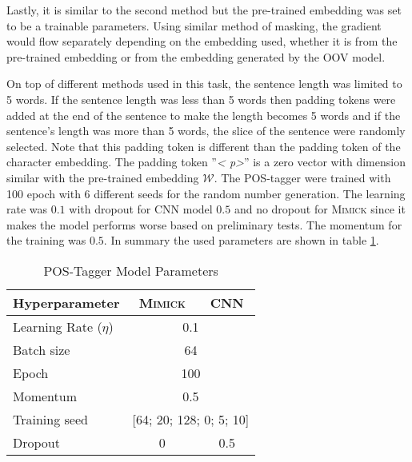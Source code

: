        Lastly, it is similar to the second method but the pre-trained
        embedding was set to be a trainable parameters. Using similar
        method of masking, the gradient would flow separately depending
        on the embedding used, whether it is from the pre-trained
        embedding or from the embedding generated by the OOV model.

        On top of different methods used in this task, the sentence
        length was limited to 5 words. If the sentence length was less
        than 5 words then padding tokens were added at the end of the
        sentence to make the length becomes 5 words and if the
        sentence's length was more than 5 words, the slice of the
        sentence were randomly selected. Note that this padding token
        is different than the padding token of the character
        embedding. The padding token ''\textit{\textless
        p\textgreater}'' is a zero vector with dimension similar with
        the pre-trained embedding $\mathcal{W}$. The POS-tagger were
        trained with 100 epoch with 6 different seeds for the random
        number generation. The learning rate was $0.1$ with dropout
        for CNN model $0.5$ and no dropout for \textsc{Mimick} since
        it makes the model performs worse based on preliminary tests.
        The momentum for the training was $0.5$. In summary the used
        parameters are shown in table \ref{tab:hyperparameterpostag}.

        \begin{table}[]
            \centering
            \caption{POS-Tagger Model Parameters}
            \label{tab:hyperparameterpostag}
            \begin{tabular}{@{}lcc@{}}
                \toprule
                \textbf{Hyperparameter} & \multicolumn{1}{c}{\textbf{\textsc{Mimick}}} & \multicolumn{1}{c}{\textbf{CNN}} \\ \midrule
                Learning Rate ($\eta$) & \multicolumn{2}{c}{0.1} \\
                Batch size & \multicolumn{2}{c}{64} \\
                Epoch & \multicolumn{2}{c}{100} \\
                Momentum & \multicolumn{2}{c}{0.5} \\
                Training seed & \multicolumn{2}{c}{[64; 20; 128; 0; 5;
                10]} \\
                Dropout & 0 & 0.5 \\ 
                \bottomrule
            \end{tabular}
        \end{table}

